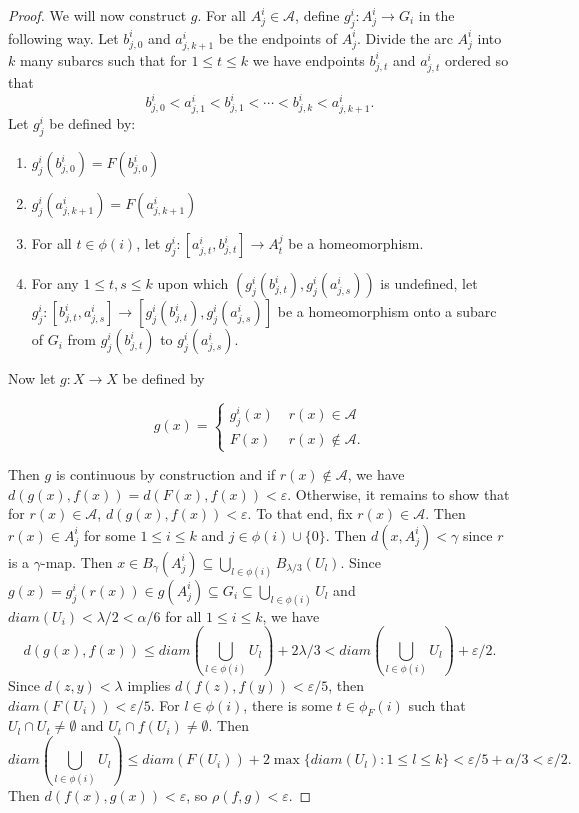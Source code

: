 \documentclass[10pt,a4paper]{amsart}
\numberwithin{equation}{section}
\begin{document}
\begin{proof}
We will now construct $g.$ For all $A_j^i\in \mathcal{A}$, define $g_j^i:A_j^i\to G_i$ in the following way. Let $b^i_{j,0}$ and $a^i_{j,k+1}$ be the endpoints of $A_j^i$. Divide the arc $A_j^i$ into $k$ many subarcs such that for $1\leq t\leq k$ we have endpoints $b^i_{j,t}$ and $a^i_{j,t}$ ordered so that $$ b^i_{j,0}<a^i_{j,1}<b^i_{j,1}<\cdots <b^i_{j,k}<a^i_{j,k+1}. $$ Let $g_j^i$ be defined by:
\begin{enumerate}
    \item[(1)] $g_j^i(b^i_{j,0})= F(b^i_{j,0}) $
    \item[(2)] $g_j^i(a^i_{j,k+1})= F(a^i_{j,k+1}) $
    \item[(3)] For all $t\in \phi(i)$, let $g_j^i:[a^i_{j,t},b^i_{j,t} ]\to A_t^j  $ be a homeomorphism. 
    \item[(4)] For any $1\leq t,s\leq k$ upon which $(g_j^i(b^i_{j,t}),g^i_j(a^i_{j,s}))$ is undefined, let $g_j^i:[b^i_{j,t},a^i_{j,s} ]\to [g_j^i(b^i_{j,t}),g^i_j(a^i_{j,s}) ]$ be a homeomorphism onto a subarc of $G_i$ from $g_j^i(b^i_{j,t})$ to $g^i_j(a^i_{j,s})$. 
\end{enumerate}

Now let $g:X\to X$ be defined by 

$$g(x)=\begin{cases}
    g_j^i(x)\; &r(x)\in \mathcal{A}\\
    F(x) \; &r(x)\notin \mathcal{A}.
\end{cases}$$


Then $g$ is continuous by construction and if $r(x)\notin \mathcal{A}$, we have $d(g(x),f(x))=d(F(x),f(x))<\varepsilon.$ Otherwise, it remains to show that for $r(x)\in \mathcal{A}$, $d(g(x),f(x))<\varepsilon.$ To that end, fix $r(x)\in \mathcal{A}$. Then $r(x)\in A^i_j$ for some $1\leq i\leq k$ and $j\in \phi(i)\cup \{0\}$. Then $d(x,A^i_j)<\gamma$ since $r$ is a $\gamma$-map. Then $x\in B_\gamma(A^i_j)\subseteq \bigcup_{l\in\phi(i)}B_{\lambda/3}(U_l).$ Since $g(x)=g_j^i(r(x))\in g(A^i_j)\subseteq G_i\subseteq \bigcup_{l\in\phi(i)}U_l$ and $diam(U_i)<\lambda/2<\alpha/6$ for all $1\leq i\leq k$, we have $$d(g(x),f(x))\leq diam\left( \bigcup_{l\in \phi(i)} U_l \right) +2\lambda/3<diam\left( \bigcup_{l\in \phi(i)} U_l \right)+\varepsilon/2.$$ Since $d(z,y)<\lambda$ implies $d(f(z),f(y))<\varepsilon/5$, then $diam(F(U_i))<\varepsilon/5. $ For $l\in \phi(i)$, there is some $t\in \phi_F(i)$ such that $U_l\cap U_t \neq \emptyset$ and $U_t\cap f(U_i) \neq \emptyset$. Then $$diam\left( \bigcup_{l\in \phi(i)} U_l \right) \leq diam(F(U_i))+2\max \{ diam(U_l):1\leq l\leq k\}<\varepsilon/5 +\alpha/3<\varepsilon/2.$$ Then $d(f(x),g(x))<\varepsilon$, so $\rho(f,g)<\varepsilon.$



\end{proof}
\end{document}
